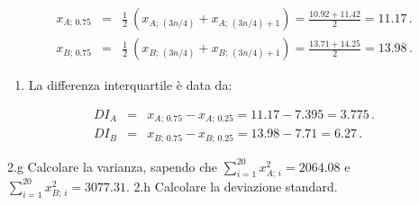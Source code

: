 \documentclass[
  11pt,
]{book}
\providecommand{\tightlist}{%
  \setlength{\itemsep}{0pt}\setlength{\parskip}{0pt}}
\theoremstyle{mytheoremstyle}
\theoremstyle{mydefstyle}
\newenvironment{sol}
  {
  \begin{tcolorbox}[enhanced,breakable,arc=0.1mm,boxrule=1pt,colback=white,colframe=iblue,
  title=\bf \fontfamily{lmss}\selectfont \hspace{.5 cm} Soluzione,drop fuzzy shadow]

}{
\end{tcolorbox}
  }
\begin{document}
\begin{sol}
\begin{eqnarray*}
x_{A;\, 0.75} &=& \frac{1} {2}\ \left( x_{A;\, (3n/4)} + x_{A;\, (3n/4)+1} \right)
               =  \frac{10.92 + 11.42} {2} = 11.17 \,. \\
x_{B;\, 0.75} &=& \frac{1} {2}\ \left( x_{B;\, (3n/4)} + x_{B;\, (3n/4)+1} \right)
               =  \frac{13.71 + 14.25} {2} = 13.98 \,.
\end{eqnarray*}

\begin{enumerate}
\def\labelenumi{\alph{enumi}.}
\setcounter{enumi}{5}
\tightlist
\item
  La differenza interquartile è data da:
\end{enumerate}

\begin{eqnarray*}
DI_{A} &=& x_{A;\, 0.75} - x_{A;\, 0.25} = 11.17 - 7.395 = 3.775 \,. \\
DI_{B} &=& x_{B;\, 0.75} - x_{B;\, 0.25} = 13.98 - 7.71  = 6.27 \,.
\end{eqnarray*}

\end{sol}

2.g Calcolare la varianza, sapendo che
\(\sum_{i=1}^{20} x_{A;\, i}^{2} = 2064.08\) e
\(\sum_{i=1}^{20} x_{B;\, i}^{2} = 3077.31\).
2.h Calcolare la deviazione standard.
\end{document}
